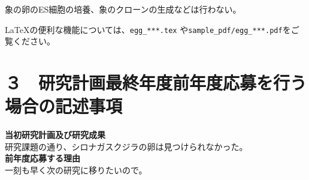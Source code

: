\documentclass[11pt,a4j,dvipdfmx]{jarticle} 					%
\newcommand{\研究課題名}{テスト}
\newcommand{\研究機関名}{東北大学}
\newcommand{\研究代表者氏名}{市川裕大}
\newcommand{\研究期間の最終元号年度}{13}  %
\begin{document}
	象の卵のES細胞の培養、象のクローンの生成などは行わない。

	\LaTeX の便利な機能については、\texttt{egg\_***.tex} や\texttt{sample\_pdf/egg\_***.pdf}をご覧ください。




\section{３　研究計画最終年度前年度応募を行う場合の記述事項}

\newcommand{\最終年度研究種目名}{基盤研究（Z）}
\newcommand{\最終年度研究課題番号}{99999}
\newcommand{\最終年度研究課題名}{シロナガスクジラの卵はなぜ見つけられないのか}
\newcommand{\最終年度研究期間}{令和？？年度〜令和\一年目 年度}


\noindent
\textbf{当初研究計画及び研究成果}\\
	研究課題の通り、シロナガスクジラの卵は見つけられなかった。
\\

\noindent
\textbf{前年度応募する理由}\\
	一刻も早く次の研究に移りたいので。








\end{document}
